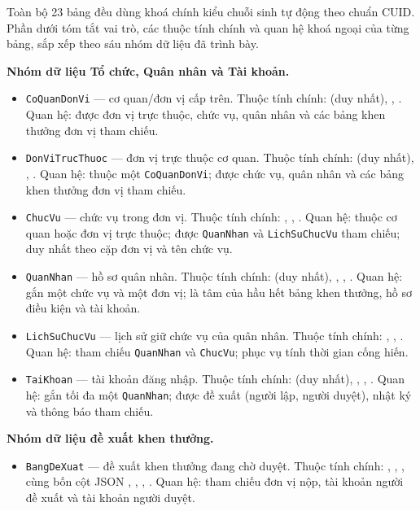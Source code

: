 \documentclass[../DoAn.tex]{subfiles}
\begin{document}
Toàn bộ 23 bảng đều dùng khoá chính  kiểu chuỗi sinh tự động theo chuẩn CUID. Phần dưới tóm tắt vai trò, các thuộc tính chính và quan hệ khoá ngoại của từng bảng, sắp xếp theo sáu nhóm dữ liệu đã trình bày.

\textbf{Nhóm dữ liệu Tổ chức, Quân nhân và Tài khoản.}
\begin{itemize}
    \item \texttt{CoQuanDonVi} --- cơ quan/đơn vị cấp trên. Thuộc tính chính:  (duy nhất), , . Quan hệ: được đơn vị trực thuộc, chức vụ, quân nhân và các bảng khen thưởng đơn vị tham chiếu.
    \item \texttt{DonViTrucThuoc} --- đơn vị trực thuộc cơ quan. Thuộc tính chính:  (duy nhất), , . Quan hệ: thuộc một \texttt{CoQuanDonVi}; được chức vụ, quân nhân và các bảng khen thưởng đơn vị tham chiếu.
    \item \texttt{ChucVu} --- chức vụ trong đơn vị. Thuộc tính chính: , , . Quan hệ: thuộc cơ quan hoặc đơn vị trực thuộc; được \texttt{QuanNhan} và \texttt{LichSuChucVu} tham chiếu; duy nhất theo cặp đơn vị và tên chức vụ.
    \item \texttt{QuanNhan} --- hồ sơ quân nhân. Thuộc tính chính:  (duy nhất), , , . Quan hệ: gắn một chức vụ và một đơn vị; là tâm của hầu hết bảng khen thưởng, hồ sơ điều kiện và tài khoản.
    \item \texttt{LichSuChucVu} --- lịch sử giữ chức vụ của quân nhân. Thuộc tính chính: , , . Quan hệ: tham chiếu \texttt{QuanNhan} và \texttt{ChucVu}; phục vụ tính thời gian cống hiến.
    \item \texttt{TaiKhoan} --- tài khoản đăng nhập. Thuộc tính chính:  (duy nhất), , , . Quan hệ: gắn tối đa một \texttt{QuanNhan}; được đề xuất (người lập, người duyệt), nhật ký và thông báo tham chiếu.
\end{itemize}

\textbf{Nhóm dữ liệu đề xuất khen thưởng.}
\begin{itemize}
    \item \texttt{BangDeXuat} --- đề xuất khen thưởng đang chờ duyệt. Thuộc tính chính: , , , cùng bốn cột JSON , , , . Quan hệ: tham chiếu đơn vị nộp, tài khoản người đề xuất và tài khoản người duyệt.
\end{itemize}
\end{document}
